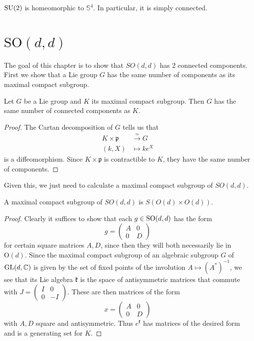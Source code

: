\documentclass{report}
\begin{document}
\begin{proposition}
    $\operatorname{{\mathrm{SU}}}(2)$ is homeomorphic to $\mathbb S^4$.
    In particular, it is simply connected.
\end{proposition}

\chapter{$\mathrm{SO}(d,d)$}
The goal of this chapter is to show that $SO(d,d)$ has 2 connected components.
First we show that a Lie group $G$ has the same number of components as its maximal compact subgroup.
\begin{proposition}
    Let $G$ be a Lie group and $K$ its maximal compact subgroup.
    Then $G$ has the same number of connected components as $K$.
\end{proposition}
\begin{proof}
    The Cartan decomposition of $G$ tells us that 
    \begin{align*}
        K \times \mathfrak p &\overset{\simeq}{\to} G\\
        (k, X) &\mapsto k e^X
    \end{align*}
    is a diffeomorphism.
    Since $K \times \mathfrak p$ is contractible to $K$, they have the same number of components.
\end{proof}
Given this, we just need to calculate a maximal compact subgroup of $SO(d,d)$.
\begin{proposition}
    A maximal compact subgroup of $SO(d,d)$ is $S(O(d) \times O(d))$.
\end{proposition}
\begin{proof}
    Clearly it suffices to show that each $g \in \operatorname{{\mathrm{SO}}}(d,d)$ has the form
    \[
    g = \begin{pmatrix} A & 0 \\ 0 & D \end{pmatrix}
    \]
    for certain square matrices $A, D$, since then they will both necessarily lie in $\mathrm{O}(d)$.
    Since the maximal compact subgroup of an algebraic subgroup $G$ of $\operatorname{{\mathrm{GL}}}(d, \mathbb C)$ is given by the set of fixed points of the involution $A \mapsto (A^*)^{-1}$, we see that its Lie algebra $\mathfrak k$ is the space of antisymmetric matrices that commute with $J = \begin{pmatrix} I & 0 \\ 0 & -I \end{pmatrix}$.
    These are then matrices of the form 
    \[
    x = \begin{pmatrix} A & 0 \\ 0 & D \end{pmatrix}
    \]
    with $A, D$ square and antisymmetric.
    Thus $e^{\mathfrak k}$ has matrices of the desired form and is a generating set for $K$.
\end{proof}
\end{document}

